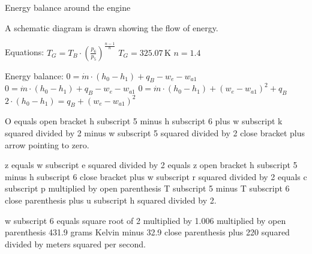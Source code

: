 Energy balance around the engine  

A schematic diagram is drawn showing the flow of energy.  

Equations:  
\( T_G = T_B \cdot \left( \frac{p_6}{p_5} \right)^{\frac{n-1}{n}} \)  
\( T_G = 325.07 \, \text{K} \)  
\( n = 1.4 \)  

Energy balance:  
\( 0 = \dot{m} \cdot (h_0 - h_1) + q_B - w_e - w_{a1} \)  
\( 0 = \dot{m} \cdot (h_0 - h_1) + q_B - w_e - w_{a1} \)  
\( 0 = \dot{m} \cdot (h_0 - h_1) + (w_e - w_{a1})^2 + q_B \)  
\( 2 \cdot (h_0 - h_1) = q_B + (w_e - w_{a1})^2 \)

O equals open bracket h subscript 5 minus h subscript 6 plus w subscript k squared divided by 2 minus w subscript 5 squared divided by 2 close bracket plus arrow pointing to zero.

z equals w subscript e squared divided by 2 equals z open bracket h subscript 5 minus h subscript 6 close bracket plus w subscript r squared divided by 2 equals c subscript p multiplied by open parenthesis T subscript 5 minus T subscript 6 close parenthesis plus u subscript h squared divided by 2.

w subscript 6 equals square root of 2 multiplied by 1.006 multiplied by open parenthesis 431.9 grams Kelvin minus 32.9 close parenthesis plus 220 squared divided by meters squared per second.